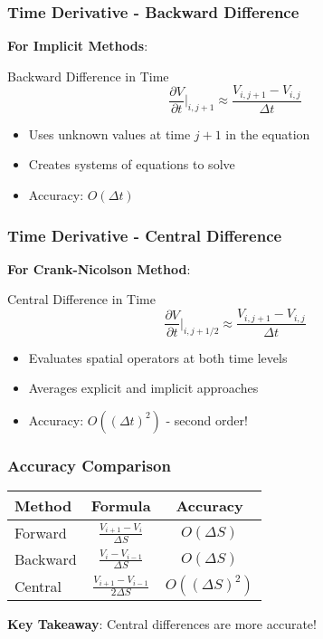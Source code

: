 \documentclass[aspectratio=169]{beamer}
\begin{document}
\begin{frame}
\frametitle{Time Derivative - Backward Difference}
\textbf{For Implicit Methods}:

\begin{block}{Backward Difference in Time}
\[\frac{\partial V}{\partial t} \bigg|_{i,j+1} \approx \frac{V_{i,j+1} - V_{i,j}}{\Delta t}\]
\end{block}

\begin{itemize}
\item Uses unknown values at time $j+1$ in the equation
\item Creates systems of equations to solve
\item Accuracy: $O(\Delta t)$
\end{itemize}
\end{frame}

\begin{frame}
\frametitle{Time Derivative - Central Difference}
\textbf{For Crank-Nicolson Method}:

\begin{block}{Central Difference in Time}
\[\frac{\partial V}{\partial t} \bigg|_{i,j+1/2} \approx \frac{V_{i,j+1} - V_{i,j}}{\Delta t}\]
\end{block}

\begin{itemize}
\item Evaluates spatial operators at both time levels
\item Averages explicit and implicit approaches
\item Accuracy: $O((\Delta t)^2)$ - second order!
\end{itemize}
\end{frame}

\begin{frame}
\frametitle{Accuracy Comparison}
\begin{center}
\begin{tabular}{lcc}
\toprule
\textbf{Method} & \textbf{Formula} & \textbf{Accuracy} \\
\midrule
Forward & $\frac{V_{i+1} - V_i}{\Delta S}$ & $O(\Delta S)$ \\
Backward & $\frac{V_i - V_{i-1}}{\Delta S}$ & $O(\Delta S)$ \\
Central & $\frac{V_{i+1} - V_{i-1}}{2\Delta S}$ & $O((\Delta S)^2)$ \\
\bottomrule
\end{tabular}
\end{center}

\textbf{Key Takeaway}: Central differences are more accurate!
\end{frame}
\end{document}

